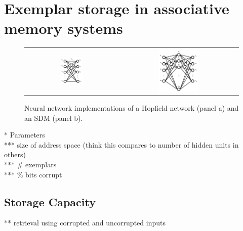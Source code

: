 \documentclass[10pt,letterpaper]{article}
\begin{document}
\section{Exemplar storage in associative memory systems}

\begin{center}
\begin{figure}[tb]
{
	\hfill{}
	\begin{tabular}{lclc}
	\raisebox{2.0in}{(a)} &
		\includegraphics[width=0.3\textwidth]{./figures/hopfieldNetwork.png} &
	\raisebox{2.0in}{(b)} &
		\includegraphics[width=0.35\textwidth]{./figures/sdmNetwork.png} 
	\end{tabular}
}
\hfill{}
\caption{Neural network implementations of a Hopfield network (panel a) and an SDM (panel b).}
\label{neuralNets}
\end{figure}
\end{center}

\noindent** Parameters \\
*** size of address space (think this compares to number of hidden units in others) \\
*** \# exemplars \\
*** \% bits corrupt \\

\subsection{Storage Capacity}
** retrieval using corrupted and uncorrupted inputs \\
\end{document}
